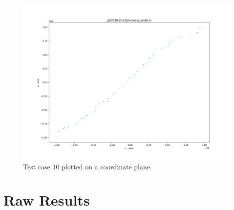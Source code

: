 \documentclass{article}
\begin{document}
\begin{appendices}
\begin{figure}[H]
	\includegraphics[scale=0.5]{code/visualizer/testdata/10.png}
	\caption{Test case 10 plotted on a coordinate plane.}
	\label{fig:10}
\end{figure}














\newpage
\section{Raw Results}
\label{appendix:RawResults}



\end{appendices}
\end{document}
